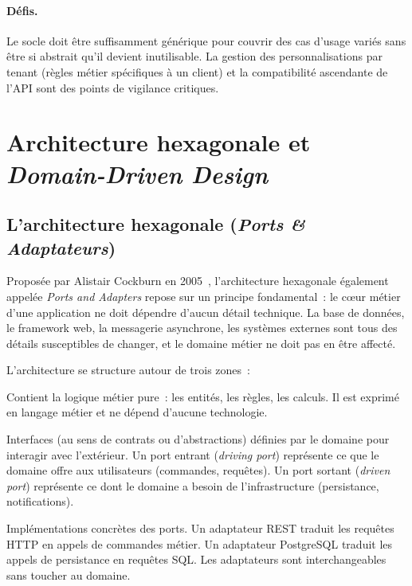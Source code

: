 \paragraph{Défis.}
Le socle doit être suffisamment générique pour couvrir des cas d'usage variés sans être si
abstrait qu'il devient inutilisable. La gestion des personnalisations par tenant (règles
métier spécifiques à un client) et la compatibilité ascendante de l'API sont des points de
vigilance critiques.

\section{Architecture hexagonale et \textit{Domain-Driven Design}}
\label{sec:hexa-ddd}

\subsection{L'architecture hexagonale (\textit{Ports \& Adaptateurs})}
\label{subsec:hexagonal}

Proposée par Alistair Cockburn en 2005~\cite{hexagonale}, l'architecture hexagonale 
également appelée \textit{Ports and Adapters} repose sur un principe fondamental~: le
c\oe{}ur métier d'une application ne doit dépendre d'aucun détail technique. La base de
données, le framework web, la messagerie asynchrone, les systèmes externes sont tous des
détails susceptibles de changer, et le domaine métier ne doit pas en être affecté.

L'architecture se structure autour de trois zones~:

\begin{description}[leftmargin=0.5cm]
  \item[\textbf{Le domaine (hexagone central)}]
    Contient la logique métier pure~: les entités, les règles, les calculs. Il est exprimé
    en langage métier et ne dépend d'aucune technologie.

  \item[\textbf{Les ports}]
    Interfaces (au sens de contrats ou d'abstractions) définies par le domaine pour
    interagir avec l'extérieur. Un port entrant (\textit{driving port}) représente ce que
    le domaine offre aux utilisateurs (commandes, requêtes). Un port sortant
    (\textit{driven port}) représente ce dont le domaine a besoin de l'infrastructure
    (persistance, notifications).

  \item[\textbf{Les adaptateurs}]
    Implémentations concrètes des ports. Un adaptateur REST traduit les requêtes HTTP en
    appels de commandes métier. Un adaptateur PostgreSQL traduit les appels de persistance
    en requêtes SQL. Les adaptateurs sont interchangeables sans toucher au domaine.
\end{description}

